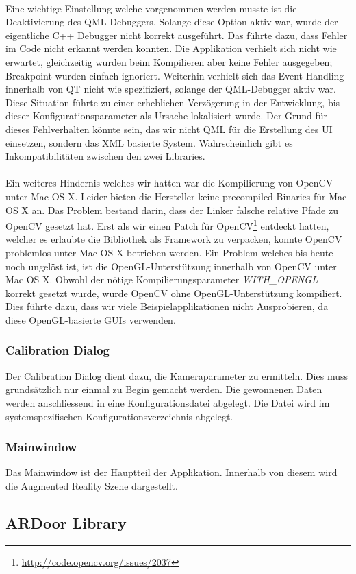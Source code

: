 \documentclass[main.tex]{subfiles}
\begin{document}
\paragraph{}
Eine wichtige Einstellung welche vorgenommen werden musste ist die Deaktivierung des QML-Debuggers. Solange diese Option aktiv war, wurde der eigentliche C++ Debugger nicht korrekt ausgeführt. Das führte dazu, dass Fehler im Code nicht erkannt werden konnten. Die Applikation verhielt sich nicht wie erwartet, gleichzeitig wurden beim Kompilieren aber keine Fehler ausgegeben; Breakpoint wurden einfach ignoriert. Weiterhin verhielt sich das Event-Handling innerhalb von QT nicht wie spezifiziert, solange der QML-Debugger aktiv war. Diese Situation führte zu einer erheblichen Verzögerung in der Entwicklung, bis dieser Konfigurationsparameter als Ursache lokalisiert wurde. Der Grund für dieses Fehlverhalten könnte sein, das wir nicht QML für die Erstellung des UI einsetzen, sondern das XML basierte System. Wahrscheinlich gibt es Inkompatibilitäten zwischen den zwei Libraries.
\paragraph{}
Ein weiteres Hindernis welches wir hatten war die Kompilierung von OpenCV unter Mac OS X. Leider bieten die Hersteller keine precompiled Binaries für Mac OS X an. Das Problem bestand darin, dass der Linker falsche relative Pfade zu OpenCV gesetzt hat. Erst als wir einen Patch für OpenCV\footnote{\url{http://code.opencv.org/issues/2037}} entdeckt hatten, welcher es erlaubte die Bibliothek als Framework zu verpacken, konnte OpenCV problemlos unter Mac OS X betrieben werden. Ein Problem welches bis heute noch ungelöst ist, ist die OpenGL-Unterstützung innerhalb von OpenCV unter Mac OS X. Obwohl der nötige Kompilierungsparameter \textit{WITH\_OPENGL} korrekt gesetzt wurde, wurde OpenCV ohne OpenGL-Unterstützung kompiliert. Dies führte dazu, dass wir viele Beispielapplikationen nicht Ausprobieren, da diese OpenGL-basierte GUIs verwenden.

\subsubsection{Calibration Dialog}
Der Calibration Dialog dient dazu, die Kameraparameter zu ermitteln. Dies muss grundsätzlich nur einmal zu Begin gemacht werden. Die gewonnenen Daten werden anschliessend in eine Konfigurationsdatei abgelegt. Die Datei wird im systemspezifischen Konfigurationsverzeichnis abgelegt.

\subsubsection{Mainwindow}
Das Mainwindow ist der Hauptteil der Applikation. Innerhalb von diesem wird die Augmented Reality Szene dargestellt.

\subsection{ARDoor Library}
\end{document}
